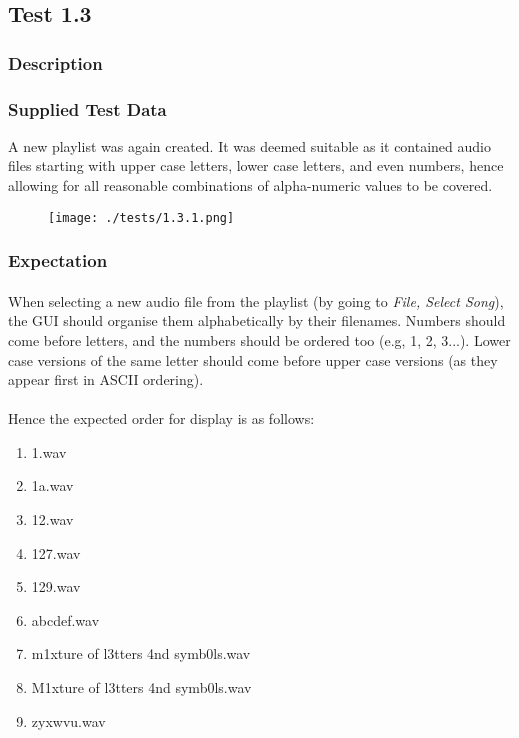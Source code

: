 \pagebreak
\subsection{Test 1.3}
\subsubsection{Description}
\paragraph{}
{
	\centering
}

\subsubsection{Supplied Test Data}
A new playlist was again created. It was deemed suitable as it contained audio files starting with upper case letters, lower case letters, and even numbers, hence allowing for all reasonable combinations of alpha-numeric values to be covered.
\begin{figure}[H]
	\texttt{[image: ./tests/1.3.1.png]}
\end{figure}

\subsubsection{Expectation}
\paragraph{}
When selecting a new audio file from the playlist (by going to \textit{File, Select Song}), the GUI should organise them alphabetically by their filenames. Numbers should come before letters, and the numbers should be ordered too (e.g, 1, 2, 3...). Lower case versions of the same letter should come before upper case versions (as they appear first in ASCII ordering).
\paragraph{}
Hence the expected order for display is as follows:
\begin{enumerate}
	\item 1.wav
	\item 1a.wav
	\item 12.wav
	\item 127.wav
	\item 129.wav
	\item abcdef.wav
	\item m1xture of l3tters 4nd symb0ls.wav
	\item M1xture of l3tters 4nd symb0ls.wav
	\item zyxwvu.wav
\end{enumerate}

